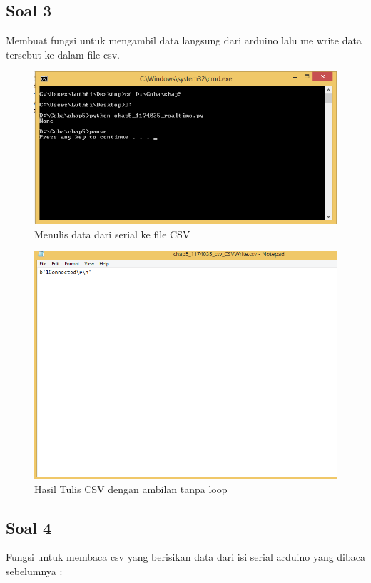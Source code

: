 	\subsection{Soal 3}
	Membuat fungsi untuk mengambil data langsung dari arduino lalu me write data tersebut ke dalam file csv.
	
	\begin{figure}[H]
		\includegraphics[width=12cm]{figures/5/1174035/Praktek/WriteCSV.png}
		\centering
		\caption{Menulis data dari serial ke file CSV}
	\end{figure}
	\begin{figure}[H]
		\includegraphics[width=12cm]{figures/5/1174035/Praktek/HasilCSV.png}
		\centering
		\caption{Hasil Tulis CSV dengan ambilan tanpa loop}
	\end{figure}
	\subsection{Soal 4}
	Fungsi untuk membaca csv yang berisikan data dari isi serial arduino yang dibaca sebelumnya :
	
	
